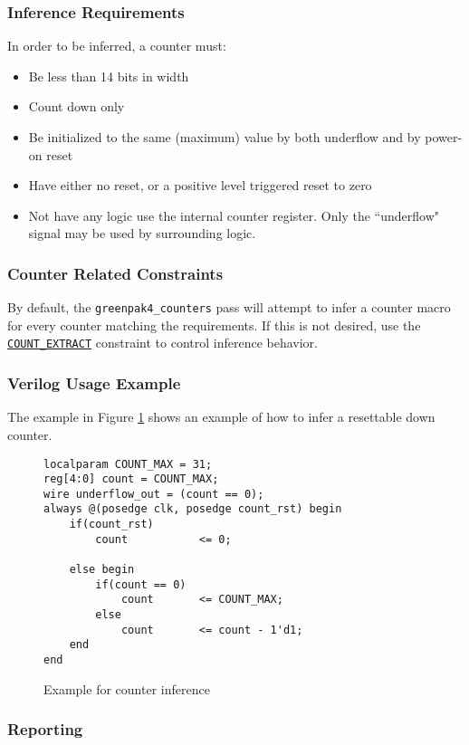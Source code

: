 \documentclass[11pt]{article}
\newcommand{\tokenstyle}[1]{\texttt{#1}}
\newcommand{\tokenref}[2]{\hyperref[#2]{\tokenstyle{#1}}}
\begin{document}
\subsubsection{Inference Requirements}

In order to be inferred, a counter must:

\begin{itemize}
\item Be less than 14 bits in width
\item Count down only
\item Be initialized to the same (maximum) value by both underflow and by power-on reset
\item Have either no reset, or a positive level triggered reset to zero
\item Not have any logic use the internal counter register. Only the ``underflow" signal may be used by surrounding logic.
\end{itemize}

\subsubsection{Counter Related Constraints}

By default, the \tokenstyle{greenpak4\_counters} pass will attempt to infer a counter macro for every counter matching the
requirements. If this is not desired, use the \tokenref{COUNT\_EXTRACT}{count-extract} constraint to control
inference behavior.

\subsubsection{Verilog Usage Example}

The example in Figure \ref{gp-countinfer-example} shows an example of how to infer a resettable down counter.

\begin{figure}[h]
\begin{lstlisting}
localparam COUNT_MAX = 31;
reg[4:0] count = COUNT_MAX;
wire underflow_out = (count == 0);
always @(posedge clk, posedge count_rst) begin
	if(count_rst)
		count			<= 0;

	else begin
		if(count == 0)
			count		<= COUNT_MAX;
		else
			count		<= count - 1'd1;
	end
end
\end{lstlisting}
\caption{Example for counter inference}
\label{gp-countinfer-example}
\end{figure}

\subsubsection{Reporting}
\end{document}
